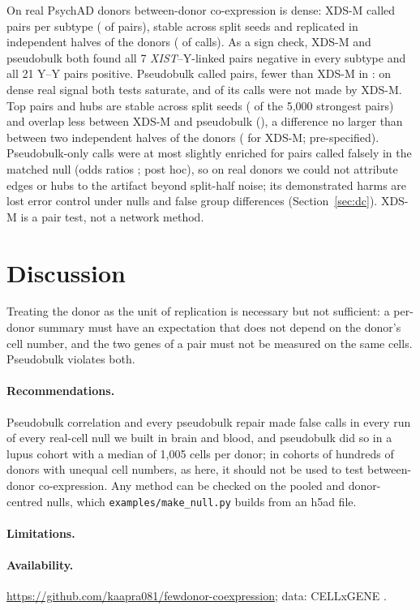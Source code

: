 On real PsychAD donors between-donor co-expression is dense: XDS-M called \RfRealXDSMrng{} pairs per subtype (\RealXDSMfracRng{} of pairs), stable across split seeds and replicated in independent halves of the donors (\RealXDSMrep{} of calls). As a sign check, XDS-M and pseudobulk both found all 7 \emph{XIST}--Y-linked pairs negative in every subtype and all 21 Y--Y pairs positive. Pseudobulk called \RfRealPBrng{} pairs, fewer than XDS-M in \RfPBfewer: on dense real signal both tests saturate, and \RfRealPBonlyPct{} of its calls were not made by XDS-M. Top pairs and hubs are stable across split seeds (\OvSeedTop{} of the 5{,}000 strongest pairs) and overlap less between XDS-M and pseudobulk (\OvPBXTop{}), a difference no larger than between two independent halves of the donors (\OvHalfXTop{} for XDS-M; pre-specified). Pseudobulk-only calls were at most slightly enriched for pairs called falsely in the matched null (odds ratios \OvORrng; post hoc), so on real donors we could not attribute edges or hubs to the artifact beyond split-half noise; its demonstrated harms are lost error control under nulls and false group differences (Section~\ref{sec:dc}). XDS-M is a pair test, not a network method.

\section{Discussion}\label{sec:disc}

Treating the donor as the unit of replication is necessary but not sufficient: a per-donor summary must have an expectation that does not depend on the donor's cell number, and the two genes of a pair must not be measured on the same cells. Pseudobulk violates both.

\paragraph{Recommendations.} Pseudobulk correlation and every pseudobulk repair made false calls in every run of every real-cell null we built in brain and blood, and pseudobulk did so in a lupus cohort with a median of 1{,}005 cells per donor; in cohorts of hundreds of donors with unequal cell numbers, as here, it should not be used to test between-donor co-expression. \RecText{} Any method can be checked on the pooled and donor-centred nulls, which \texttt{examples/make\_null.py} builds from an h5ad file.

\paragraph{Limitations.} \LimText{}

\paragraph{Availability.} \url{https://github.com/kaapra081/fewdonor-coexpression}; data: CELLxGENE \citep{CZICellxGene2025}.
